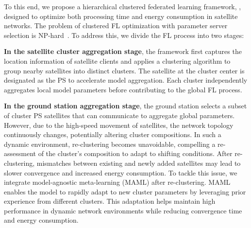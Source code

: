 

To this end, we propose a hierarchical clustered federated learning framework, \algname, designed to optimize both processing time and energy consumption in satellite networks. The problem of clustered FL optimization with parameter server selection is NP-hard~\cite{XuIoT24}. To address this, we divide the FL process into two stages: 

\textbf{In the satellite cluster aggregation stage}, the framework first captures the location information of satellite clients and applies a clustering algorithm to group nearby satellites into distinct clusters. The satellite at the cluster center is designated as the PS to accelerate model aggregation. 
Each cluster independently aggregates local model parameters before contributing to the global FL process.

\textbf{In the ground station aggregation stage}, the ground station selects a subset of cluster PS satellites that can communicate to aggregate global parameters. However, due to the high-speed movement of satellites, the network topology continuously changes, potentially altering cluster compositions. 
In such a dynamic environment, re-clustering becomes unavoidable, compelling a re-assessment of the cluster’s composition to adapt to shifting conditions. After re-clustering, mismatches between existing and newly added satellites may lead to slower convergence and increased energy consumption. To tackle this issue, we integrate model-agnostic meta-learning (MAML) after re-clustering. MAML enables the model to rapidly adapt to new cluster parameters by leveraging prior experience from different clusters. This adaptation helps maintain high performance in dynamic network environments while reducing convergence time and energy consumption.

